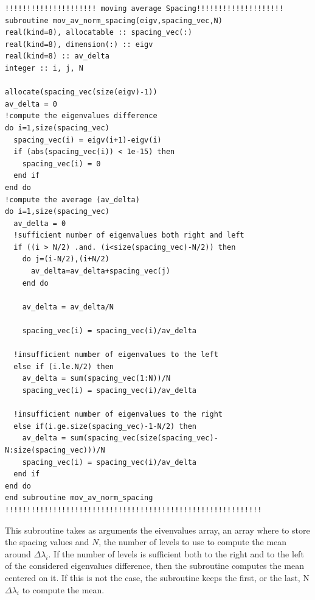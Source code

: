 \documentclass[prb,9pt,notitlepage]{revtex4-1}
\begin{document}
\begin{lstlisting}
!!!!!!!!!!!!!!!!!!!!! moving average Spacing!!!!!!!!!!!!!!!!!!!!
subroutine mov_av_norm_spacing(eigv,spacing_vec,N)
real(kind=8), allocatable :: spacing_vec(:)
real(kind=8), dimension(:) :: eigv
real(kind=8) :: av_delta
integer :: i, j, N

allocate(spacing_vec(size(eigv)-1))
av_delta = 0
!compute the eigenvalues difference
do i=1,size(spacing_vec)
  spacing_vec(i) = eigv(i+1)-eigv(i)
  if (abs(spacing_vec(i)) < 1e-15) then
    spacing_vec(i) = 0
  end if
end do
!compute the average (av_delta)
do i=1,size(spacing_vec)
  av_delta = 0
  !sufficient number of eigenvalues both right and left
  if ((i > N/2) .and. (i<size(spacing_vec)-N/2)) then
    do j=(i-N/2),(i+N/2)
      av_delta=av_delta+spacing_vec(j)
    end do

    av_delta = av_delta/N

    spacing_vec(i) = spacing_vec(i)/av_delta

  !insufficient number of eigenvalues to the left
  else if (i.le.N/2) then
    av_delta = sum(spacing_vec(1:N))/N
    spacing_vec(i) = spacing_vec(i)/av_delta

  !insufficient number of eigenvalues to the right
  else if(i.ge.size(spacing_vec)-1-N/2) then
    av_delta = sum(spacing_vec(size(spacing_vec)-N:size(spacing_vec)))/N
    spacing_vec(i) = spacing_vec(i)/av_delta
  end if
end do
end subroutine mov_av_norm_spacing
!!!!!!!!!!!!!!!!!!!!!!!!!!!!!!!!!!!!!!!!!!!!!!!!!!!!!!!!!!!
\end{lstlisting}
This subroutine takes as arguments the eivenvalues array, an array where to store the spacing values and $N$, the number of levels to use to compute the mean around $\Delta\lambda_i$. If the number of levels is sufficient both to the right and to the left of the considered eigenvalues difference, then the subroutine computes the mean centered on it. If this is not the case, the subroutine keeps the first, or the last, N $\Delta \lambda_i$ to compute the mean.
\end{document}
